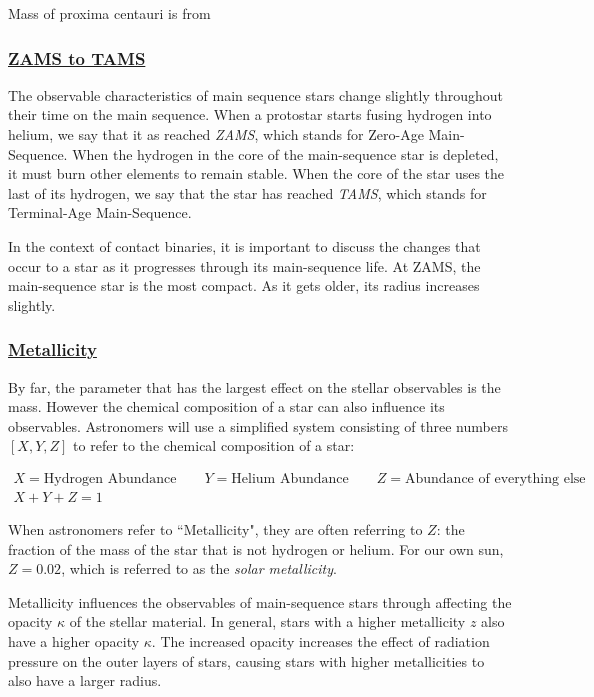 \documentclass[12pt]{article} %
\numberwithin{equation}{section} %
\begin{document}
Mass of proxima centauri is from \citep{segransan2003first}

\subsubsection[ZAMS to TAMS]{\hyperlink{toc}{ZAMS to TAMS}} \label{sec: ZAMS to TAMS}

The observable characteristics of main sequence stars change slightly throughout their time on the main sequence. When a protostar starts fusing hydrogen into helium, we say that it as reached \emph{ZAMS}, which stands for Zero-Age Main-Sequence. When the hydrogen in the core of the main-sequence star is depleted, it must burn other elements to remain stable. When the core of the star uses the last of its hydrogen, we say that the star has reached \emph{TAMS}, which stands for Terminal-Age Main-Sequence.

In the context of contact binaries, it is important to discuss the changes that occur to a star as it progresses through its main-sequence life. At ZAMS, the main-sequence star is the most compact. As it gets older, its radius increases slightly.

\subsubsection[Metallicity]{\hyperlink{toc}{Metallicity}} \label{sec: Metallicity}

By far, the parameter that has the largest effect on the stellar observables is the mass. However the chemical composition of a star can also influence its observables. Astronomers will use a simplified system consisting of three numbers $[X,Y,Z]$ to refer to the chemical composition of a star:

\begin{multline} \label{def_metallicity}
X = \text{Hydrogen Abundance} \qquad Y = \text{Helium Abundance} \qquad Z = \text{Abundance of everything else} \\
X + Y + Z = 1
\end{multline}

When astronomers refer to ``Metallicity", they are often referring to $Z$: the fraction of the mass of the star that is not hydrogen or helium. For our own sun, $Z = 0.02$, which is referred to as the \emph{solar metallicity}.

Metallicity influences the observables of main-sequence stars through affecting the opacity $\kappa$ of the stellar material. In general, stars with a higher metallicity $z$ also have a higher opacity $\kappa$. The increased opacity increases the effect of radiation pressure on the outer layers of stars, causing stars with higher metallicities to also have a larger radius.
\end{document}
